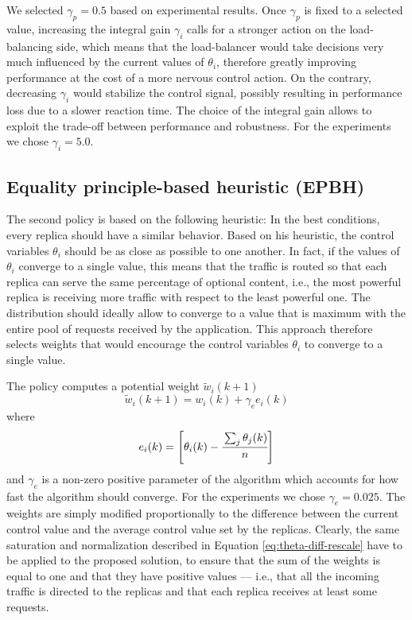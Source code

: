 We selected $\gamma_p = 0.5$ based on experimental results. Once
$\gamma_p$ is fixed to a selected value, increasing the integral gain
$\gamma_i$ calls for a stronger action on the load-balancing side,
which means that the load-balancer would take decisions very much
influenced by the current values of $\theta_i$, therefore greatly
improving performance at the cost of a more nervous control action. On
the contrary, decreasing $\gamma_i$ would stabilize the control
signal, possibly resulting in performance loss due to a slower
reaction time. The choice of the integral gain allows to exploit the
trade-off between performance and robustness. For the experiments we
chose $\gamma_i = 5.0$.

\subsection{Equality principle-based heuristic (EPBH)}

The second policy is based on the following heuristic: In the best
conditions, every replica should have a similar behavior. Based on his
heuristic, the control variables $\theta_i$ should be as close as
possible to one another. In fact, if the values of $\theta_i$ converge
to a single value, this means that the traffic is routed so that each
replica can serve the same percentage of optional content, i.e., the
most powerful replica is receiving more traffic with respect to the
least powerful one. The distribution should ideally allow to converge
to a value that is maximum with the entire pool of requests received
by the application. This approach therefore selects weights that would
encourage the control variables $\theta_i$ to converge to a single
value.

The policy computes a potential weight $\tilde{w}_i(k+1)$
\begin{equation}
  \tilde{w}_i(k+1) = w_i(k) + \gamma_e e_i(k)
\label{eq:equal-thetas}
\end{equation}
where
$$e_i(k)=\left[ \theta_i (k) - \cfrac{\sum_j \theta_j (k) }{n} \right]$$
and $\gamma_e$ is a non-zero positive parameter of the algorithm which
accounts for how fast the algorithm should converge. For the
experiments we chose $\gamma_e = 0.025$. The weights are simply
modified proportionally to the difference between the current control
value and the average control value set by the replicas. Clearly, the
same saturation and normalization described in Equation
\eqref{eq:theta-diff-rescale} have to be applied to the proposed
solution, to ensure that the sum of the weights is equal to one and
that they have positive values --- i.e., that all the incoming traffic
is directed to the replicas and that each replica receives at least
some requests.

